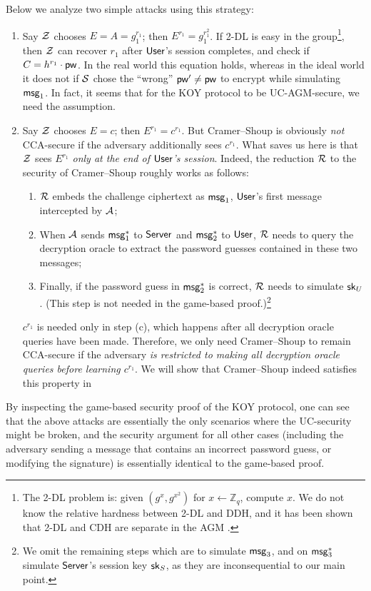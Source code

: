 Below we analyze two simple attacks using this strategy:
\begin{enumerate}
	\item Say $\mathcal{Z}$ chooses $E = A = g_1^{r_1}$; then $E^{r_1} = g_1^{r_1^2}$. If 2-DL is easy in the group\footnote{The 2-DL problem is: given $(g^x,g^{x^2})$ for $x \gets \mathbb{Z}_q$, compute $x$. We do not know the relative hardness between 2-DL and DDH, and it has been shown that 2-DL and CDH are separate in the AGM \cite{C:BauFucLos20}.}, then $\mathcal{Z}$ can recover $r_1$ after $\mathsf{User}$'s session completes, and check if $C = h^{r_1} \cdot \mathsf{pw}$. In the real world this equation holds, whereas in the ideal world it does not if $\mathcal{S}$ chose the ``wrong'' $\mathsf{pw}' \neq \mathsf{pw}$ to encrypt while simulating $\mathsf{msg}_{1}$. In fact, it seems that for the KOY protocol to be UC-AGM-secure, we need the  assumption. 
	\item Say $\mathcal{Z}$ chooses $E = c$; then $E^{r_1} = c^{r_1}$. But Cramer--Shoup is obviously \emph{not} CCA-secure if the adversary additionally sees $c^{r_1}$. What saves us here is that $\mathcal{Z}$ sees $E^{r_1}$ \emph{only at the end of $\mathsf{User}$'s session}. Indeed, the reduction $\mathcal{R}$ to the security of Cramer--Shoup roughly works as follows:
	\begin{enumerate}
		\item $\mathcal{R}$ embeds the challenge ciphertext as $\mathsf{msg}_{1}$, $\mathsf{User}$'s first message intercepted by $\mathcal{A}$;
		\item When $\mathcal{A}$ sends $\mathsf{msg}_{1}^*$ to $\mathsf{Server}$ and $\mathsf{msg}_{2}^*$ to $\mathsf{User}$, $\mathcal{R}$ needs to query the decryption oracle to extract the password guesses contained in these two messages;
		\item Finally, if the password guess in $\mathsf{msg}_{2}^*$ is correct, $\mathcal{R}$ needs to simulate $\mathsf{sk}_U$. (This step is not needed in the game-based proof.)\footnote{We omit the remaining steps which are to simulate $\mathsf{msg}_{3}$, and on $\mathsf{msg}_{3}^*$ simulate $\mathsf{Server}$'s session key $\mathsf{sk}_S$, as they are inconsequential to our main point.}
	\end{enumerate}
	$c^{r_1}$ is needed only in step (c), which happens after all decryption oracle queries have been made. Therefore, we only need Cramer--Shoup to remain CCA-secure if the adversary \emph{is restricted to making all decryption oracle queries before learning $c^{r_1}$}. We will show that Cramer--Shoup indeed satisfies this property in  
\end{enumerate}
By inspecting the game-based security proof of the KOY protocol, one can see that the above attacks are essentially the only scenarios where the UC-security might be broken, and the security argument for all other cases (including the adversary sending a message that contains an incorrect password guess, or modifying the signature) is essentially identical to the game-based proof. 